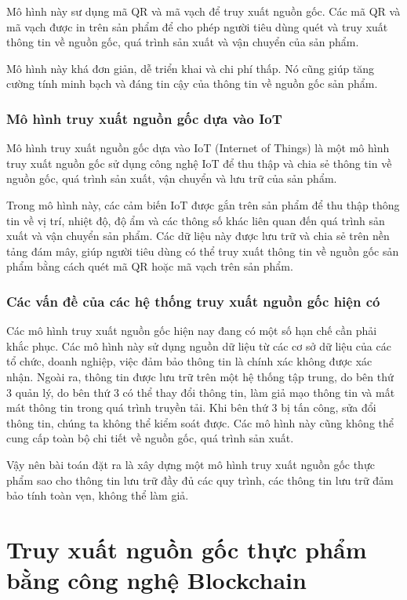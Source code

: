 Mô hình này sư dụng mã QR và mã vạch để truy xuất nguồn gốc. Các mã QR và mã vạch 
được in trên sản phẩm để cho phép người tiêu dùng quét và truy xuất thông tin về 
nguồn gốc, quá trình sản xuất và vận chuyển của sản phẩm.

Mô hình này khá đơn giản, dễ triển khai và chi phí thấp. Nó cũng giúp tăng cường 
tính minh bạch và đáng tin cậy của thông tin về nguồn gốc sản phẩm.
\subsubsection{Mô hình truy xuất nguồn gốc dựa vào IoT }
Mô hình truy xuất nguồn gốc dựa vào IoT (Internet of Things) là một mô hình truy 
xuất nguồn gốc sử dụng công nghệ IoT để thu thập và chia sẻ thông tin về nguồn gốc, 
quá trình sản xuất, vận chuyển và lưu trữ của sản phẩm.

Trong mô hình này, các cảm biến IoT được gắn trên sản phẩm để thu thập thông tin 
về vị trí, nhiệt độ, độ ẩm và các thông số khác liên quan đến quá trình sản xuất 
và vận chuyển sản phẩm. Các dữ liệu này được lưu trữ và chia sẻ trên nền tảng 
đám mây, giúp người tiêu dùng có thể truy xuất thông tin về nguồn gốc sản phẩm 
bằng cách quét mã QR hoặc mã vạch trên sản phẩm.

\subsubsection{Các vấn đề của các hệ thống truy xuất nguồn gốc hiện có}

Các mô hình truy xuất nguồn gốc hiện nay đang có một số hạn chế cần phải khắc phục. 
Các mô hình này sử dụng nguồn dữ liệu từ các cơ sở dữ liệu của các tổ chức, doanh
nghiệp, việc đảm bảo thông tin là chính xác không được xác nhận. Ngoài ra, thông 
tin được lưu trữ trên một hệ thống tập trung, do bên thứ 3 quản lý, do bên thứ 3
có thể thay đổi thông tin, làm giả mạo thông tin và mất mát thông tin trong quá
trình truyền tải. Khi bên thứ 3 bị tấn công, sửa đổi thông tin, chúng ta không 
thể kiểm soát được. Các mô hình này cũng không thể cung cấp toàn bộ chi tiết 
về nguồn gốc, quá trình sản xuất.

Vậy nên bài toán đặt ra là xây dựng một mô hình truy xuất nguồn gốc thực phẩm
sao cho thông tin lưu trữ đầy đủ các quy trình, các thông tin lưu trữ đảm bảo tính
toàn vẹn, không thể làm giả.


\section{Truy xuất nguồn gốc thực phẩm bằng công nghệ Blockchain}

